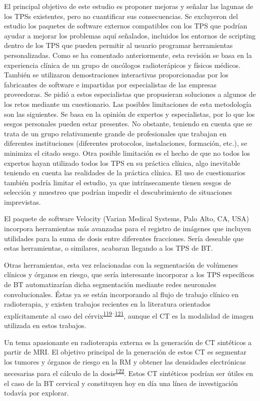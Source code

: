 \documentclass[
  a4paper,
]{scrreprt}
\begin{document}
El principal objetivo de este estudio es proponer mejoras y señalar las
lagunas de los TPSs existentes, pero no cuantificar sus consecuencias.
Se excluyeron del estudio los paquetes de software externos compatibles
con los TPS que podrían ayudar a mejorar los problemas aquí señalados,
incluidos los entornos de scripting dentro de los TPS que pueden
permitir al usuario programar herramientas personalizadas. Como se ha
comentado anteriormente, esta revisión se basa en la experiencia clínica
de un grupo de oncólogos radioterápicos y físicos médicos. También se
utilizaron demostraciones interactivas proporcionadas por los
fabricantes de software e impartidas por especialistas de las empresas
proveedoras. Se pidió a estos especialistas que propusieran soluciones a
algunos de los retos mediante un cuestionario. Las posibles limitaciones
de esta metodología son las siguientes. Se basa en la opinión de
expertos y especialistas, por lo que los sesgos personales pueden estar
presentes. No obstante, teniendo en cuenta que se trata de un grupo
relativamente grande de profesionales que trabajan en diferentes
instituciones (diferentes protocolos, instalaciones, formación, etc.),
se minimiza el citado sesgo. Otra posible limitación es el hecho de que
no todos los expertos hayan utilizado todos los TPS en su práctica
clínica, algo inevitable teniendo en cuenta las realidades de la
práctica clínica. El uso de cuestionarios también podría limitar el
estudio, ya que intrínsecamente tienen sesgos de selección y muestreo
que podrían impedir el descubrimiento de situaciones imprevistas.

El paquete de software Velocity (Varian Medical Systems, Palo Alto, CA,
USA) incorpora herramientas más avanzadas para el registro de imágenes
que incluyen utilidades para la suma de dosis entre diferentes
fracciones. Sería deseable que estas herramientas, o similares, acabaran
llegando a los TPS de BT.

Otras herramientas, esta vez relacionadas con la segmentación de
volúmenes clínicos y órganos en riesgo, que sería interesante incorporar
a los TPS específicos de BT automatizarían dicha segmentación mediante
redes neuronales convolucionales. Éstas ya se están incorporando al
flujo de trabajo clínico en radioterapia, y existen trabajos recientes
en la literatura orientados explícitamente al caso del
cérvix\textsuperscript{\protect\hyperlink{ref-ma2021}{119}--\protect\hyperlink{ref-wang2020}{121}},
aunque el CT es la modalidad de imagen utilizada en estos trabajos.

Un tema apasionante en radioterapia externa es la generación de CT
sintéticos a partir de MRI. El objetivo principal de la generación de
estos CT es segmentar los tumores y órganos de riesgo en la RM y obtener
las densidades electrónicas necesarias para el cálculo de la
dosis\textsuperscript{\protect\hyperlink{ref-boulanger2021}{122}}. Estos
CT sintéticos podrían ser útiles en el caso de la BT cervical y
constituyen hoy en día una línea de investigación todavía por explorar.
\end{document}
